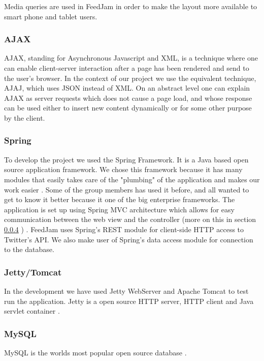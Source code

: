 Media queries are used in FeedJam in order to make the layout more available to smart phone and tablet users.

\subsubsection{AJAX}%
AJAX, standing for Asynchronous Javascript and XML, is a technique where one can enable client-server interaction after a page has been rendered and send to the user's browser. In the context of our project we use the equivalent technique, AJAJ, which uses JSON instead of XML. On an abstract level one can explain AJAX as server requests which does not cause a page load, and whose response can be used either to insert new content dynamically or for some other purpose by the client.

\subsubsection{Spring} %
To develop the project we used the Spring Framework. It is a Java based open source application framework. We chose this framework because it has many modules that easily takes care of the "plumbing" of the application and makes our work easier \citep{SpringSourcec}. Some of the group members has used it before, and all wanted to get to know it better because it one of the big enterprise frameworks. The application is set up using Spring MVC architecture which allows for easy communication between the web view and the controller (more on this in section \ref{} \nameref{}) \citep{SpringSourcee}. FeedJam uses Spring's REST module for client-side HTTP access to Twitter's API. We also make user of Spring's data access module for connection to the database.

\subsubsection{Jetty/Tomcat} %
In the development we have used Jetty WebServer and Apache Tomcat to test run the application. Jetty is a open source HTTP server, HTTP client and Java servlet container \citep{MortBayConsultinga}. 

\subsubsection{MySQL} %
MySQL is the worlds most popular open source database \citep{OracleCorporationand/oritsaffiliates}.

